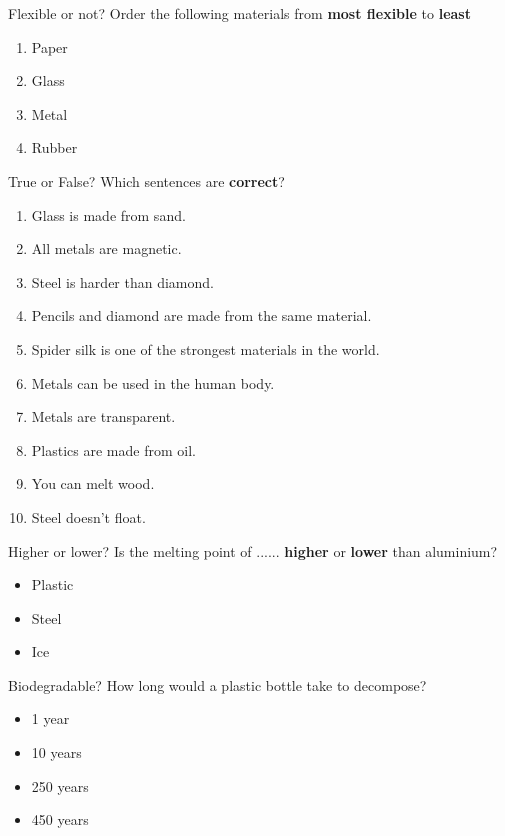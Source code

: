 \documentclass[a4paper, 12pt]{article}
\begin{document}
	\pagestyle{empty}
	\begin{question}[colback=red!10]{Flexible or not?}
  		Order the following materials from \textbf{most flexible} to \textbf{least}
  		
  		\begin{enumerate}[font=\bfseries]
  		\centering
  			\item Paper
  			\item Glass
  			\item Metal
  			\item Rubber
  		\end{enumerate}
	\end{question}
	\begin{question}[]{True or False?}
  		Which sentences are \textbf{correct}?
  		
  		\begin{multicols}{2}
  		\begin{enumerate}[font=\bfseries]
  			\item Glass is made from sand.
  			\item All metals are magnetic.
  			\item Steel is harder than diamond.
  			\item Pencils and diamond are made from the same material.
  			\item Spider silk is one of the strongest materials in the world.
  			\item Metals can be used in the human body.
  			\item Metals are transparent.
  			\item Plastics are made from oil.
  			\item You can melt wood.
  			\item Steel doesn’t float.
  		\end{enumerate}
  		\end{multicols}
	\end{question}
	\newpage
	\begin{question}[colback=green!10]{Higher or lower?}
  		Is the melting point of ...... \textbf{higher} or \textbf{lower} than aluminium?
  		\begin{itemize}
  		\centering
  			\item Plastic
  			\item Steel
  			\item Ice
  		\end{itemize}
	\end{question}
	\begin{question}[colback=cyan!10]{Biodegradable?}
  		How long would a plastic bottle take to decompose?
  		\begin{itemize}
  		\centering
  			\item 1 year
  			\item 10 years
  			\item 250 years
  			\item 450 years
  		\end{itemize}
	\end{question}
	\newpage
	\begin{question}[]{}
		
	\end{question}
\end{document}
